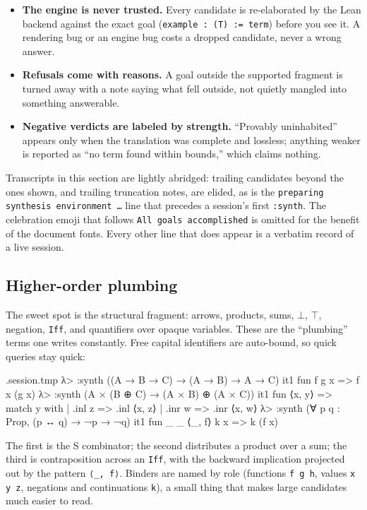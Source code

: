 \documentclass[11pt,oneside]{article}
\newcommand{\code}[1]{\texttt{#1}}
\newenvironment{session}
 {\VerbatimEnvironment\begin{VerbatimOut}{\jobname.session.tmp}}
 {\end{VerbatimOut}%
  \begin{sessionouter}%
  \VerbatimInput[fontsize=\footnotesize, breaklines=true,
    breaksymbolleft={\textcolor{stone}{\footnotesize$\hookrightarrow$}},
    formatcom=\color{ink}, tabsize=4]{\jobname.session.tmp}%
  \end{sessionouter}}
\begin{document}
\begin{itemize}
\item \textbf{The engine is never trusted.} Every candidate is
  re-elaborated by the Lean backend against the exact goal
  (\code{example :\ (T) :=\ term}) before you see it. A rendering bug
  or an engine bug costs a dropped candidate, never a wrong answer.
\item \textbf{Refusals come with reasons.} A goal outside the
  supported fragment is turned away with a note saying what fell
  outside, not quietly mangled into something answerable.
\item \textbf{Negative verdicts are labeled by strength.}
  ``Provably uninhabited'' appears only when the translation was
  complete and lossless; anything weaker is reported as ``no term
  found within bounds,'' which claims nothing.
\end{itemize}

Transcripts in this section are lightly abridged: trailing candidates
beyond the ones shown, and trailing truncation notes, are elided, as is
the \code{preparing synthesis environment \dots} line that precedes a
session's first \code{:synth}.  The celebration emoji that follows
\code{All goals accomplished} is omitted for the benefit of the
document fonts.  Every other line that does appear is a verbatim record
of a live session.

\subsection{Higher-order plumbing}\label{sec:plumbing}

The sweet spot is the structural fragment: arrows, products, sums,
$\bot$, $\top$, negation, \code{Iff}, and quantifiers over opaque
variables. These are the ``plumbing'' terms one writes constantly.
Free capital identifiers are auto-bound, so quick queries stay quick:

\begin{session}
λ> :synth ((A → B → C) → (A → B) → A → C)
  it1  fun f g x => f x (g x)
λ> :synth (A × (B ⊕ C) → (A × B) ⊕ (A × C))
  it1  fun ⟨x, y⟩ => match y with | .inl z => .inl ⟨x, z⟩ | .inr w => .inr ⟨x, w⟩
λ> :synth (∀ p q : Prop, (p ↔ q) → ¬p → ¬q)
  it1  fun _ _ ⟨_, f⟩ k x => k (f x)
\end{session}

The first is the S combinator; the second distributes a product over a
sum; the third is contraposition across an \code{Iff}, with the
backward implication projected out by the pattern
\code{⟨\_, f⟩}. Binders are named by role (functions \code{f g h},
values \code{x y z}, negations and continuations \code{k}), a small
thing that makes large candidates much easier to read.
\end{document}
